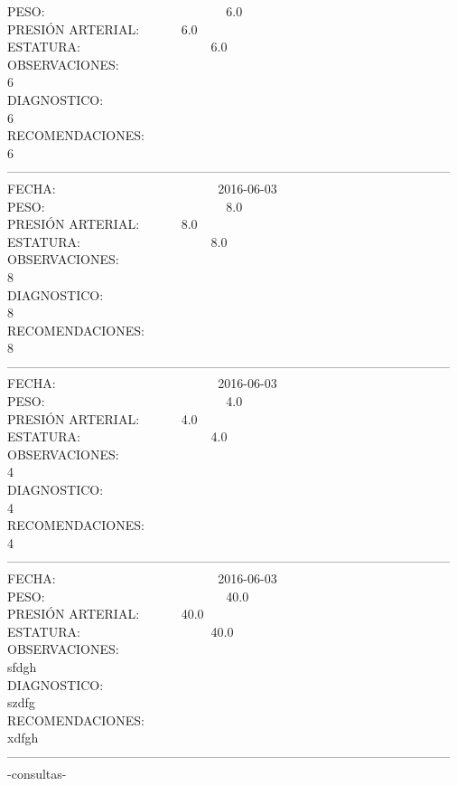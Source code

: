 \documentclass[10pt,a4paper]{letter}
\begin{document}
PESO: \ \ \ \ \ \ \ \ \ \ \ \ \ \ \ \ \ \ \ \ \ \ \ \ \ \ \ \ 6.0 \\
PRESIÓN ARTERIAL: \ \ \ \ \ \ 6.0 \\
ESTATURA: \ \ \ \ \ \ \ \ \ \ \ \ \ \ \ \ \ \ \ \ 6.0\\
OBSERVACIONES:\\
6\\
DIAGNOSTICO:\\
6\\
RECOMENDACIONES:\\
6\\
--------------------------------------------------------------------------------------------------------- \\
FECHA: \ \ \ \ \ \ \ \ \ \ \ \ \ \ \ \ \ \ \ \ \ \ \ \ \ 2016-06-03 \\
PESO: \ \ \ \ \ \ \ \ \ \ \ \ \ \ \ \ \ \ \ \ \ \ \ \ \ \ \ \ 8.0 \\
PRESIÓN ARTERIAL: \ \ \ \ \ \ 8.0 \\
ESTATURA: \ \ \ \ \ \ \ \ \ \ \ \ \ \ \ \ \ \ \ \ 8.0\\
OBSERVACIONES:\\
8\\
DIAGNOSTICO:\\
8\\
RECOMENDACIONES:\\
8\\
--------------------------------------------------------------------------------------------------------- \\
FECHA: \ \ \ \ \ \ \ \ \ \ \ \ \ \ \ \ \ \ \ \ \ \ \ \ \ 2016-06-03 \\
PESO: \ \ \ \ \ \ \ \ \ \ \ \ \ \ \ \ \ \ \ \ \ \ \ \ \ \ \ \ 4.0 \\
PRESIÓN ARTERIAL: \ \ \ \ \ \ 4.0 \\
ESTATURA: \ \ \ \ \ \ \ \ \ \ \ \ \ \ \ \ \ \ \ \ 4.0\\
OBSERVACIONES:\\
4\\
DIAGNOSTICO:\\
4\\
RECOMENDACIONES:\\
4\\
--------------------------------------------------------------------------------------------------------- \\
FECHA: \ \ \ \ \ \ \ \ \ \ \ \ \ \ \ \ \ \ \ \ \ \ \ \ \ 2016-06-03 \\
PESO: \ \ \ \ \ \ \ \ \ \ \ \ \ \ \ \ \ \ \ \ \ \ \ \ \ \ \ \ 40.0 \\
PRESIÓN ARTERIAL: \ \ \ \ \ \ 40.0 \\
ESTATURA: \ \ \ \ \ \ \ \ \ \ \ \ \ \ \ \ \ \ \ \ 40.0\\
OBSERVACIONES:\\
sfdgh\\
DIAGNOSTICO:\\
szdfg\\
RECOMENDACIONES:\\
xdfgh\\
--------------------------------------------------------------------------------------------------------- \\
-consultas-
\end{document}
